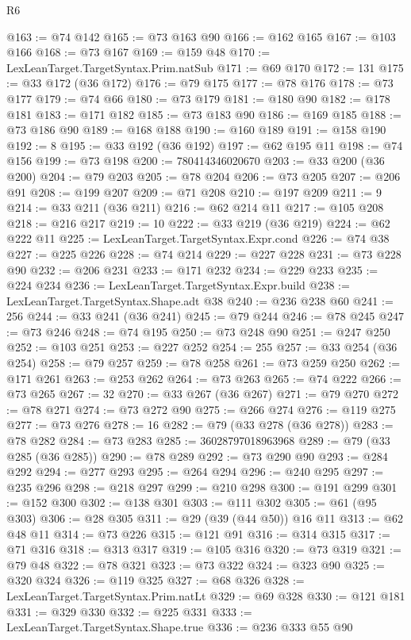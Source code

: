 \begin{lexlean}{R6}
\begin{coremodule}
@163 := @74 @142
@165 := @73 @163 @90
@166 := @162 @165
@167 := @103 @166
@168 := @73 @167
@169 := @159 @48
@170 := LexLeanTarget.TargetSyntax.Prim.natSub
@171 := @69 @170
@172 := 131
@175 := @33 @172 (@36 @172)
@176 := @79 @175
@177 := @78 @176
@178 := @73 @177
@179 := @74 @66
@180 := @73 @179
@181 := @180 @90
@182 := @178 @181
@183 := @171 @182
@185 := @73 @183 @90
@186 := @169 @185
@188 := @73 @186 @90
@189 := @168 @188
@190 := @160 @189
@191 := @158 @190
@192 := 8
@195 := @33 @192 (@36 @192)
@197 := @62 @195 @11
@198 := @74 @156
@199 := @73 @198
@200 := 780414346020670
@203 := @33 @200 (@36 @200)
@204 := @79 @203
@205 := @78 @204
@206 := @73 @205
@207 := @206 @91
@208 := @199 @207
@209 := @71 @208
@210 := @197 @209
@211 := 9
@214 := @33 @211 (@36 @211)
@216 := @62 @214 @11
@217 := @105 @208
@218 := @216 @217
@219 := 10
@222 := @33 @219 (@36 @219)
@224 := @62 @222 @11
@225 := LexLeanTarget.TargetSyntax.Expr.cond
@226 := @74 @38
@227 := @225 @226
@228 := @74 @214
@229 := @227 @228
@231 := @73 @228 @90
@232 := @206 @231
@233 := @171 @232
@234 := @229 @233
@235 := @224 @234
@236 := LexLeanTarget.TargetSyntax.Expr.build
@238 := LexLeanTarget.TargetSyntax.Shape.adt @38
@240 := @236 @238 @60
@241 := 256
@244 := @33 @241 (@36 @241)
@245 := @79 @244
@246 := @78 @245
@247 := @73 @246
@248 := @74 @195
@250 := @73 @248 @90
@251 := @247 @250
@252 := @103 @251
@253 := @227 @252
@254 := 255
@257 := @33 @254 (@36 @254)
@258 := @79 @257
@259 := @78 @258
@261 := @73 @259 @250
@262 := @171 @261
@263 := @253 @262
@264 := @73 @263
@265 := @74 @222
@266 := @73 @265
@267 := 32
@270 := @33 @267 (@36 @267)
@271 := @79 @270
@272 := @78 @271
@274 := @73 @272 @90
@275 := @266 @274
@276 := @119 @275
@277 := @73 @276
@278 := 16
@282 := @79 (@33 @278 (@36 @278))
@283 := @78 @282
@284 := @73 @283
@285 := 36028797018963968
@289 := @79 (@33 @285 (@36 @285))
@290 := @78 @289
@292 := @73 @290 @90
@293 := @284 @292
@294 := @277 @293
@295 := @264 @294
@296 := @240 @295
@297 := @235 @296
@298 := @218 @297
@299 := @210 @298
@300 := @191 @299
@301 := @152 @300
@302 := @138 @301
@303 := @111 @302
@305 := @61 (@95 @303)
@306 := @28 @305
@311 := @29 (@39 (@44 @50)) @16 @11
@313 := @62 @48 @11
@314 := @73 @226
@315 := @121 @91
@316 := @314 @315
@317 := @71 @316
@318 := @313 @317
@319 := @105 @316
@320 := @73 @319
@321 := @79 @48
@322 := @78 @321
@323 := @73 @322
@324 := @323 @90
@325 := @320 @324
@326 := @119 @325
@327 := @68 @326
@328 := LexLeanTarget.TargetSyntax.Prim.natLt
@329 := @69 @328
@330 := @121 @181
@331 := @329 @330
@332 := @225 @331
@333 := LexLeanTarget.TargetSyntax.Shape.true
@336 := @236 @333 @55 @90

\end{coremodule}
\end{lexlean}
